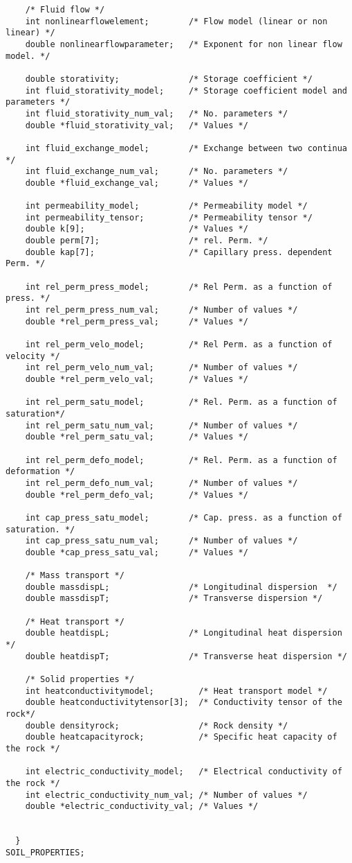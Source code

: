 \begin{verbatim}
    /* Fluid flow */
    int nonlinearflowelement;        /* Flow model (linear or non linear) */
    double nonlinearflowparameter;   /* Exponent for non linear flow model. */

    double storativity;              /* Storage coefficient */
    int fluid_storativity_model;     /* Storage coefficient model and parameters */
    int fluid_storativity_num_val;   /* No. parameters */
    double *fluid_storativity_val;   /* Values */

    int fluid_exchange_model;        /* Exchange between two continua */
    int fluid_exchange_num_val;      /* No. parameters */
    double *fluid_exchange_val;      /* Values */

    int permeability_model;          /* Permeability model */
    int permeability_tensor;         /* Permeability tensor */
    double k[9];                     /* Values */
    double perm[7];                  /* rel. Perm. */
    double kap[7];                   /* Capillary press. dependent Perm. */

    int rel_perm_press_model;        /* Rel Perm. as a function of press. */
    int rel_perm_press_num_val;      /* Number of values */
    double *rel_perm_press_val;      /* Values */

    int rel_perm_velo_model;         /* Rel Perm. as a function of velocity */
    int rel_perm_velo_num_val;       /* Number of values */
    double *rel_perm_velo_val;       /* Values */

    int rel_perm_satu_model;         /* Rel. Perm. as a function of saturation*/
    int rel_perm_satu_num_val;       /* Number of values */
    double *rel_perm_satu_val;       /* Values */

    int rel_perm_defo_model;         /* Rel. Perm. as a function of deformation */
    int rel_perm_defo_num_val;       /* Number of values */
    double *rel_perm_defo_val;       /* Values */

    int cap_press_satu_model;        /* Cap. press. as a function of saturation. */
    int cap_press_satu_num_val;      /* Number of values */
    double *cap_press_satu_val;      /* Values */

    /* Mass transport */
    double massdispL;                /* Longitudinal dispersion  */
    double massdispT;                /* Transverse dispersion */

    /* Heat transport */
    double heatdispL;                /* Longitudinal heat dispersion   */
    double heatdispT;                /* Transverse heat dispersion */

    /* Solid properties */
    int heatconductivitymodel;         /* Heat transport model */
    double heatconductivitytensor[3];  /* Conductivity tensor of the rock*/
    double densityrock;                /* Rock density */
    double heatcapacityrock;           /* Specific heat capacity of the rock */

    int electric_conductivity_model;   /* Electrical conductivity of the rock */
    int electric_conductivity_num_val; /* Number of values */
    double *electric_conductivity_val; /* Values */


  }
SOIL_PROPERTIES;
\end{verbatim}

\newpage

